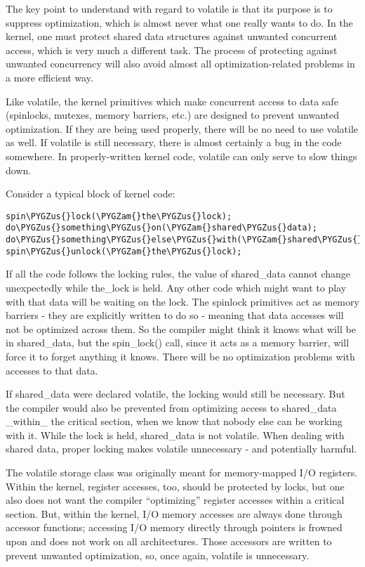 \documentclass[a4paper,8pt,english]{sphinxmanual}
\def\PYGZus{\char`\_}
\def\PYGZam{\char`\&}
\begin{document}
The key point to understand with regard to volatile is that its purpose is
to suppress optimization, which is almost never what one really wants to
do.  In the kernel, one must protect shared data structures against
unwanted concurrent access, which is very much a different task.  The
process of protecting against unwanted concurrency will also avoid almost
all optimization-related problems in a more efficient way.

Like volatile, the kernel primitives which make concurrent access to data
safe (spinlocks, mutexes, memory barriers, etc.) are designed to prevent
unwanted optimization.  If they are being used properly, there will be no
need to use volatile as well.  If volatile is still necessary, there is
almost certainly a bug in the code somewhere.  In properly-written kernel
code, volatile can only serve to slow things down.

Consider a typical block of kernel code:

\begin{Verbatim}[commandchars=\\\{\}]
spin\PYGZus{}lock(\PYGZam{}the\PYGZus{}lock);
do\PYGZus{}something\PYGZus{}on(\PYGZam{}shared\PYGZus{}data);
do\PYGZus{}something\PYGZus{}else\PYGZus{}with(\PYGZam{}shared\PYGZus{}data);
spin\PYGZus{}unlock(\PYGZam{}the\PYGZus{}lock);
\end{Verbatim}

If all the code follows the locking rules, the value of shared\_data cannot
change unexpectedly while the\_lock is held.  Any other code which might
want to play with that data will be waiting on the lock.  The spinlock
primitives act as memory barriers - they are explicitly written to do so -
meaning that data accesses will not be optimized across them.  So the
compiler might think it knows what will be in shared\_data, but the
spin\_lock() call, since it acts as a memory barrier, will force it to
forget anything it knows.  There will be no optimization problems with
accesses to that data.

If shared\_data were declared volatile, the locking would still be
necessary.  But the compiler would also be prevented from optimizing access
to shared\_data \_within\_ the critical section, when we know that nobody else
can be working with it.  While the lock is held, shared\_data is not
volatile.  When dealing with shared data, proper locking makes volatile
unnecessary - and potentially harmful.

The volatile storage class was originally meant for memory-mapped I/O
registers.  Within the kernel, register accesses, too, should be protected
by locks, but one also does not want the compiler ``optimizing'' register
accesses within a critical section.  But, within the kernel, I/O memory
accesses are always done through accessor functions; accessing I/O memory
directly through pointers is frowned upon and does not work on all
architectures.  Those accessors are written to prevent unwanted
optimization, so, once again, volatile is unnecessary.
\end{document}
